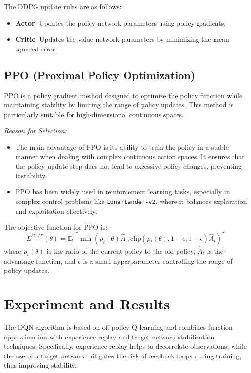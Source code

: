 \documentclass[conference]{IEEEtran}
\begin{document}
The DDPG update rules are as follows:
\begin{itemize}
    \item \textbf{Actor}: Updates the policy network parameters using policy gradients.
    \item \textbf{Critic}: Updates the value network parameters by minimizing the mean squared error.
\end{itemize}

\subsection{PPO (Proximal Policy Optimization)}

PPO is a policy gradient method designed to optimize the policy function while maintaining stability by limiting the range of policy updates. This method is particularly suitable for high-dimensional continuous spaces.

\par \textit{\quad Reason for Selection:}
\begin{itemize}
    \item The main advantage of PPO is its ability to train the policy in a stable manner when dealing with complex continuous action spaces. It ensures that the policy update step does not lead to excessive policy changes, preventing instability.
    \item PPO has been widely used in reinforcement learning tasks, especially in complex control problems like \texttt{LunarLander-v2}, where it balances exploration and exploitation effectively.
\end{itemize}

The objective function for PPO is:
\[
L^{CLIP}(\theta) = \mathbb{E}_t \left[ \min \left( \rho_t(\theta) \hat{A}_t, \text{clip}(\rho_t(\theta), 1-\epsilon, 1+\epsilon) \hat{A}_t \right) \right]
\]
where \(\rho_t(\theta)\) is the ratio of the current policy to the old policy, \(\hat{A}_t\) is the advantage function, and \(\epsilon\) is a small hyperparameter controlling the range of policy updates.





\section{Experiment and Results}
The DQN algorithm is based on off-policy Q-learning and combines function approximation with experience replay and target network stabilization techniques. Specifically, experience replay helps to decorrelate observations, while the use of a target network mitigates the risk of feedback loops during training, thus improving stability.
\end{document}

